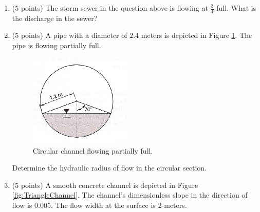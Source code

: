\documentclass[12pt]{article}
\begin{document}
\begin{enumerate}
\item (5 points) The storm sewer in the question above is flowing at $\frac{3}{4}$ full.  What is the discharge in the sewer?
\item  (5 points) A pipe with a diameter of $2.4$ meters is depicted in Figure \ref{fig:CircularSewerToo}.   The pipe is flowing partially full.

\begin{figure}[h!] %
\centering
   \includegraphics[width=1.9in]{CircularSewerToo.jpg}
   \caption{Circular channel flowing partially full.}
   \label{fig:CircularSewerToo} 
\end{figure}

Determine the hydraulic radius of flow in the circular section.
~\clearpage
\item  (5 points) A smooth concrete channel is depicted in Figure \ref{fig:TriangleChannel}.  The channel's dimensionless slope in the direction of flow is $0.005$.  The flow width at the surface is $2$-meters. 


\end{enumerate}
\end{document}
